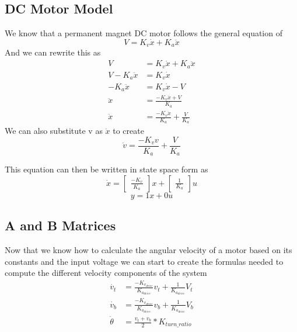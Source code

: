 \documentclass{scrartcl}
\begin{document}
\subsection{DC Motor Model}
We know that a permanent magnet DC motor follows the general equation of
\begin{equation}
    V = K_v\dot{x} + K_a\ddot{x}
\end{equation}
And we can rewrite this as
\begin{align*}
    V               & = K_v\dot{x} + K_a\ddot{x}                \\
    V - K_a\ddot{x} & = K_v\dot{x}                              \\
    -K_a\ddot{x}    & = K_v\dot{x} - V                          \\
    \ddot{x}        & = \frac{-K_v\dot{x} + V}{K_a}             \\
    \ddot{x}        & = \frac{-K_v\dot{x}}{K_a} + \frac{V}{K_a}
\end{align*}
We can also substitute v as \(\dot{x}\) to create
\begin{equation}
    \dot{v} = \frac{-K_v v}{K_a} + \frac{V}{K_a}
\end{equation}

This equation can then be written in state space form as
\begin{equation}
    \dot{x} = \begin{bmatrix}\frac{-K_v}{K_a}\end{bmatrix}x + \begin{bmatrix}\frac{1}{K_a}\end{bmatrix}u
\end{equation}
\begin{equation}
    y = 1x + 0u
\end{equation}

\subsection{A and B Matrices}
Now that we know how to calculate the angular velocity of a motor based on its constants and the input voltage we can start to create the formulas needed to compute the different velocity components of the system
\begin{align}
    \dot{v_t}    & = \frac{-K_{v_\mathit{drive}}}{K_{a_\mathit{drive}}}v_t + \frac{1}{K_{a_\mathit{drive}}}V_t \\
    \dot{v_b}    & = \frac{-K_{v_\mathit{drive}}}{K_{a_\mathit{drive}}}v_b + \frac{1}{K_{a_\mathit{drive}}}V_b \\
    \dot{\theta} & = \frac{v_t + v_b}{2} * K_\mathit{turn\_ratio}
\end{align}
\end{document}
